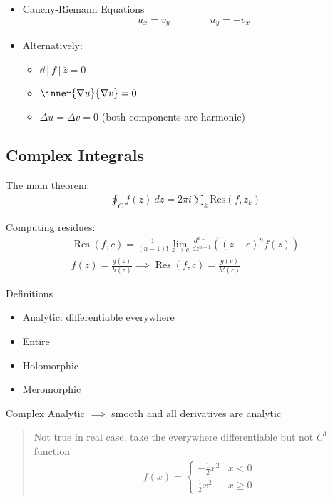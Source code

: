 \begin{itemize}
\tightlist
\item
  Cauchy-Riemann Equations
  \begin{align*}
  u_x = v_y \hspace{4em}u_y = -v_x
  \end{align*}
\item
  Alternatively:

  \begin{itemize}
  \tightlist
  \item
    \(\dd[f]{\bar z} = 0\)
  \item
    \(\inner{\nabla u}{\nabla v} = 0\)
  \item
    \(\Delta u = \Delta v = 0\) (both components are harmonic)
  \end{itemize}
\end{itemize}

\hypertarget{complex-integrals}{%
\subsection{Complex Integrals}\label{complex-integrals}}

The main theorem:
\begin{align*}
\oint_C f(z)~dz = 2\pi i \sum_k \mathrm{Res}(f, z_k)
\end{align*}

Computing residues:
\begin{align*}
\operatorname { Res } ( f , c ) = \frac { 1 } { ( n - 1 ) ! } \lim _ { z \rightarrow c } \frac { d ^ { n - 1 } } { d z ^ { n - 1 } } \left( ( z - c ) ^ { n } f ( z ) \right) \\
f(z) = \frac{g(z)}{h(z)} \implies \operatorname { Res } ( f , c ) = \frac{g(c)}{h'(c)}
\end{align*}

Definitions

\begin{itemize}
\tightlist
\item
  Analytic: differentiable everywhere
\item
  Entire
\item
  Holomorphic
\item
  Meromorphic
\end{itemize}

Complex Analytic \(\implies\) smooth and all derivatives are analytic

\begin{quote}
Not true in real case, take the everywhere differentiable but not
\(C^1\) function
\begin{align*}
f(x) = 
\begin{cases}
-\frac{1}{2}x^2 & x < 0 \\ 
\frac{1}{2}x^2 & x \geq 0
\end{cases}
\end{align*}
\end{quote}

